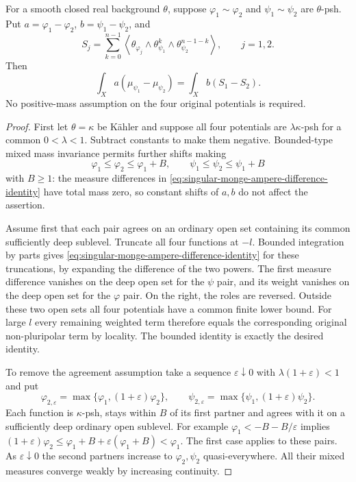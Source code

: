 \begin{lemma}\label{lem:singular-monge-ampere-difference-identity}
For a smooth closed real background $\theta$, suppose
$\varphi_1\sim\varphi_2$ and $\psi_1\sim\psi_2$ are $\theta$-psh. Put $a=\varphi_1-\varphi_2$, $b=\psi_1-\psi_2$, and
\[
 S_j=\sum_{k=0}^{n-1}
       \left\langle\theta_{\varphi_j}\wedge\theta_{\psi_1}^{k}
                                      \wedge\theta_{\psi_2}^{n-1-k}\right\rangle,
       \qquad j=1,2.
\]
Then
\begin{equation}\label{eq:singular-monge-ampere-difference-identity}
 \int_Xa(\mu_{\psi_1}-\mu_{\psi_2})
                         =\int_Xb(S_1-S_2).
\end{equation}
No positive-mass assumption on the four original potentials is required.
\end{lemma}
\begin{proof}
First let $\theta=\kappa$ be K\"ahler and suppose all four potentials are $\lambda\kappa$-psh for a common $0<\lambda<1$. Subtract constants to make them negative. Bounded-type mixed mass invariance permits further shifts making
\[
 \varphi_1\leq\varphi_2\leq\varphi_1+B,
                 \qquad\psi_1\leq\psi_2\leq\psi_1+B
\]
with $B\geq1$: the measure differences in \eqref{eq:singular-monge-ampere-difference-identity} have total mass zero, so constant shifts of $a,b$ do not affect the assertion.

Assume first that each pair agrees on an ordinary open set containing its common sufficiently deep sublevel. Truncate all four functions at $-l$. Bounded integration by parts gives \eqref{eq:singular-monge-ampere-difference-identity} for these truncations, by expanding the difference of the two powers. The first measure difference vanishes on the deep open set for the $\psi$ pair, and its weight vanishes on the deep open set for the $\varphi$ pair. On the right, the roles are reversed. Outside these two open sets all four potentials have a common finite lower bound. For large $l$ every remaining weighted term therefore equals the corresponding original non-pluripolar term by locality. The bounded identity is exactly the desired identity.

To remove the agreement assumption take a sequence $\varepsilon\downarrow0$ with $\lambda(1+\varepsilon)<1$ and put
\[
 \varphi_{2,\varepsilon}=\max\{\varphi_1,(1+\varepsilon)\varphi_2\},
 \qquad\psi_{2,\varepsilon}=\max\{\psi_1,(1+\varepsilon)\psi_2\}.
\]
Each function is $\kappa$-psh, stays within $B$ of its first partner and agrees with it on a sufficiently deep ordinary open sublevel. For example $\varphi_1<-B-B/\varepsilon$ implies
$(1+\varepsilon)\varphi_2\leq\varphi_1+B+\varepsilon(\varphi_1+B)<\varphi_1$.
The first case applies to these pairs. As $\varepsilon\downarrow0$ the second partners increase to $\varphi_2,\psi_2$ quasi-everywhere. All their mixed measures converge weakly by increasing continuity.


\end{proof}
